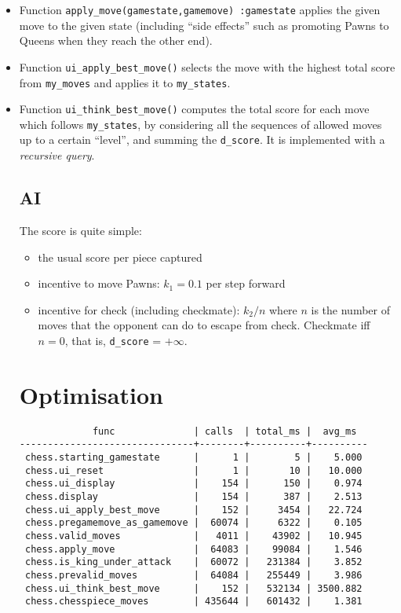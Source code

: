\begin{itemize}
\item Function \verb+apply_move(gamestate,gamemove) :gamestate+
  applies the given move to the given state (including ``side
  effects'' such as promoting Pawns to Queens when they reach the
  other end).

\item Function \verb+ui_apply_best_move()+ selects the move with the
  highest total score from \verb+my_moves+ and applies it to
  \verb+my_states+.

\item Function \verb+ui_think_best_move()+ computes the total score
  for each move which follows \verb+my_states+, by considering all the
  sequences of allowed moves up to a certain ``level'', and summing
  the \verb+d_score+. It is implemented with a \emph{recursive query}.

\subsection{AI}

The score is quite simple:
\begin{itemize}
\item the usual score per piece captured
\item incentive to move Pawns: $k_1=0.1$ per step forward
\item incentive for check (including checkmate): $k_2/n$ where $n$ is
  the number of moves that the opponent can do to escape from
  check. Checkmate iff $n=0$, that is, \verb+d_score+ = $+\infty$.
\end{itemize}

\section{Optimisation}

\begin{verbatim}
             func              | calls  | total_ms |  avg_ms  
-------------------------------+--------+----------+----------
 chess.starting_gamestate      |      1 |        5 |    5.000
 chess.ui_reset                |      1 |       10 |   10.000
 chess.ui_display              |    154 |      150 |    0.974
 chess.display                 |    154 |      387 |    2.513
 chess.ui_apply_best_move      |    152 |     3454 |   22.724
 chess.pregamemove_as_gamemove |  60074 |     6322 |    0.105
 chess.valid_moves             |   4011 |    43902 |   10.945
 chess.apply_move              |  64083 |    99084 |    1.546
 chess.is_king_under_attack    |  60072 |   231384 |    3.852
 chess.prevalid_moves          |  64084 |   255449 |    3.986
 chess.ui_think_best_move      |    152 |   532134 | 3500.882
 chess.chesspiece_moves        | 435644 |   601432 |    1.381
\end{verbatim}


\end{itemize}

